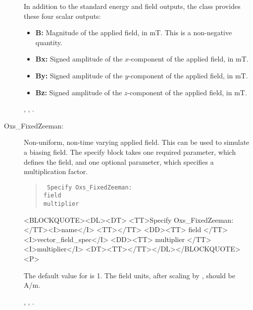 \begin{description}
   In addition to the standard energy and field outputs, the
    class provides these four scalar outputs:
   \begin{itemize}
   \item \textbf{B:} Magnitude of the applied field, in
   mT.  This is a non-negative quantity.
   \item \textbf{Bx:} Signed amplitude of the $x$-component
   of the applied field, in mT.
   \item \textbf{By:} Signed amplitude of the $y$-component
   of the applied field, in mT.
   \item \textbf{Bz:} Signed amplitude of the $z$-component
   of the applied field, in mT.
   \end{itemize}

   \begin{ExampleMifs}
     , , .
   \end{ExampleMifs}

\item[Oxs\_FixedZeeman:]
%
   Non-uniform, non-time varying applied field.
   This can be used to simulate a biasing field.  The specify block
   takes one required parameter, which defines the field, and one
   optional parameter, which specifies a multiplication factor.
      \begin{latexonly}
      \begin{quote}\tt
      Specify Oxs\_FixedZeeman: \ocb\\
       \bi field \\
       \bi multiplier \\
      \ccb
      \end{quote}
      \end{latexonly}
      \begin{rawhtml}
      <BLOCKQUOTE><DL><DT>
      <TT>Specify Oxs_FixedZeeman:</TT><I>name</I> <TT>{</TT>
      <DD><TT> field </TT> <I>vector_field_spec</I>
      <DD><TT> multiplier </TT> <I>multiplier</I>
      <DT><TT>}</TT></DL></BLOCKQUOTE><P>
      \end{rawhtml}
   The default value for  is 1.  The field units,
   after scaling by , should be A/m.

   \begin{ExampleMifs}
     , , .
   \end{ExampleMifs}


\end{description}
